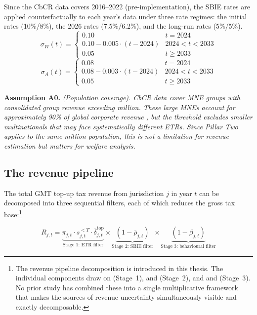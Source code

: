 \documentclass[11pt,a4paper]{article}
\newcommand{\EUR}{\texteuro}
\newcommand{\assumption}[2]{\noindent\textbf{Assumption #1.} \textit{#2}\medskip}
\begin{document}
Since the CbCR data covers 2016--2022 (pre-implementation), the SBIE rates are applied counterfactually to each year's data under three rate regimes: the initial rates (10\%/8\%), the 2026 rates (7.5\%/6.2\%), and the long-run rates (5\%/5\%).
\begin{equation}\label{eq:sbie_rates_W}
\sigma_W(t) = \begin{cases} 0.10 & t = 2024 \\ 0.10 - 0.005 \cdot (t - 2024) & 2024 < t < 2033 \\ 0.05 & t \geq 2033 \end{cases}
\end{equation}
\begin{equation}\label{eq:sbie_rates_A}
\sigma_A(t) = \begin{cases} 0.08 & t = 2024 \\ 0.08 - 0.003 \cdot (t - 2024) & 2024 < t < 2033 \\ 0.05 & t \geq 2033 \end{cases}
\end{equation}

\assumption{A0}{(Population coverage). CbCR data cover MNE groups with consolidated group revenue exceeding \EUR750 million. These large MNEs account for approximately 90\% of global corporate revenue \citep{hugger2026}, but the threshold excludes smaller multinationals that may face systematically different ETRs. Since Pillar Two applies to the same \EUR750 million population, this is not a limitation for revenue estimation but matters for welfare analysis.}

\subsection{The revenue pipeline}\label{sec:pipeline}

The total GMT top-up tax revenue from jurisdiction $j$ in year $t$ can be decomposed into three sequential filters, each of which reduces the gross tax base:\footnote{The revenue pipeline decomposition is introduced in this thesis. The individual components draw on \citet{hugger2026} (Stage~1), \citet{schjelderup2024} and \citet{devereux2023} (Stage~2), and \citet{dowd2017} and \citet{garcia-bernardo2024} (Stage~3). No prior study has combined these into a single multiplicative framework that makes the sources of revenue uncertainty simultaneously visible and exactly decomposable.}

\begin{equation}\label{eq:pipeline}
R_{j,t} = \underbrace{\pi_{j,t} \cdot s_{j,t}^{<T} \cdot \bar{\delta}_{j,t}^{\text{top}}}_{\text{Stage 1: ETR filter}} \times \underbrace{\left(1 - \bar{\rho}_{j,t}\right)}_{\text{Stage 2: SBIE filter}} \times \underbrace{\left(1 - \beta_{j,t}\right)}_{\text{Stage 3: behavioural filter}}
\end{equation}
\end{document}
